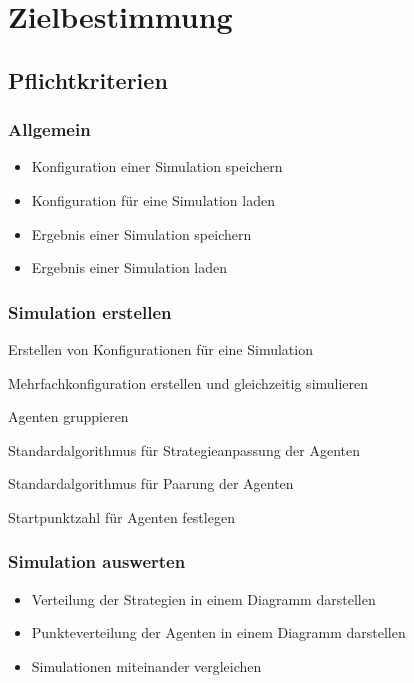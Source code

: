 \section{Zielbestimmung}

\subsection{Pflichtkriterien}

\subsubsection{Allgemein}
{\color{red}
\begin{itemize}
\item Konfiguration einer Simulation speichern
\item Konfiguration für eine Simulation laden
\item Ergebnis einer Simulation speichern
\item Ergebnis einer Simulation laden
\end{itemize}
}

\subsubsection{Simulation erstellen}

\begin{itemize}
\item Erstellen von Konfigurationen für eine Simulation
{\color{red}
\item Mehrfachkonfiguration erstellen und gleichzeitig simulieren
}
\item Agenten gruppieren
{\color{red}
\item Standardalgorithmus für Strategieanpassung der Agenten
\item Standardalgorithmus für Paarung der Agenten 
\item Startpunktzahl für Agenten festlegen
}
\end{itemize}


\subsubsection{Simulation auswerten}
\begin{itemize}
\item Verteilung der Strategien in einem Diagramm darstellen
\item Punkteverteilung der Agenten in einem Diagramm darstellen
\item Simulationen miteinander vergleichen
\end{itemize}

